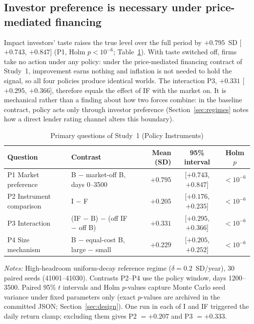 \documentclass[11pt]{article}
\begin{document}
\subsection{Investor preference is necessary under price-mediated financing}\label{sec:preference}

Impact investors' taste raises the true level over the full period by $+0.795$~SD [$+0.743$, $+0.847$] (P1, Holm $p < 10^{-6}$; Table~\ref{tab:primary}). With taste switched off, firms take no action under any policy: under the price-mediated financing contract of Study~1, improvement earns nothing and inflation is not needed to hold the signal, so all four policies produce identical worlds. The interaction P3, $+0.331$ [$+0.295$, $+0.366$], therefore equals the effect of IF with the market on. It is mechanical rather than a finding about how two forces combine: in the baseline contract, policy acts only through investor preference (Section~\ref{sec:regimes} notes how a direct lender rating channel alters this boundary).

\begin{table}[t]
\centering
\small
\begin{threeparttable}
\caption{Primary questions of Study~1 (Policy Instruments)}
\label{tab:primary}
\begin{tabular}{@{}llrcc@{}}
\toprule
Question & Contrast & Mean (SD) & 95\% interval & Holm $p$ \\
\midrule
P1 Market preference & B $-$ market-off B, days 0--3500 & $+0.795$ & [$+0.743$, $+0.847$] & $< 10^{-6}$ \\
P2 Instrument comparison & I $-$ F & $+0.205$ & [$+0.176$, $+0.235$] & $< 10^{-6}$ \\
P3 Interaction & (IF $-$ B) $-$ (off IF $-$ off B) & $+0.331$ & [$+0.295$, $+0.366$] & $< 10^{-6}$ \\
P4 Size mechanism & B $-$ equal-cost B, large $-$ small & $+0.229$ & [$+0.205$, $+0.252$] & $< 10^{-6}$ \\
\bottomrule
\end{tabular}
\begin{tablenotes}[flushleft]\footnotesize
\item \textit{Notes:} High-headroom uniform-decay reference regime ($\delta = 0.2$~SD/year), 30 paired seeds (41001--41030). Contrasts P2--P4 use the policy window, days 1200--3500. Paired 95\% $t$ intervals and Holm $p$-values capture Monte Carlo seed variance under fixed parameters only (exact $p$-values are archived in the committed JSON; Section~\ref{sec:design}). One run in each of I and IF triggered the daily return clamp; excluding them gives P2 $= +0.207$ and P3 $= +0.333$.
\end{tablenotes}
\end{threeparttable}
\end{table}
\end{document}
